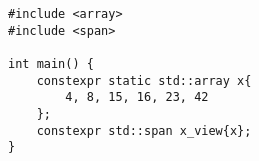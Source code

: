 \begin{lstlisting}[title=\href{https://godbolt.org/z/MXgBx4}{\texttt{godbolt.org/z/MXgBx4}}]
#include <array>
#include <span>

int main() {
    constexpr static std::array x{
        4, 8, 15, 16, 23, 42
    };
    constexpr std::span x_view{x};
}
\end{lstlisting}
